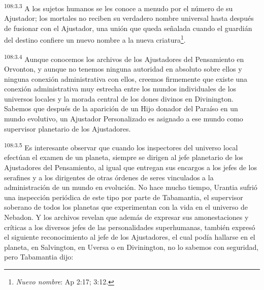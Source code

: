 \par
\textsuperscript{108:3.3} A los sujetos humanos se les conoce a menudo por el número de su Ajustador; los mortales no reciben su verdadero nombre universal hasta después de fusionar con el Ajustador, una unión que queda señalada cuando el guardián del destino confiere un nuevo nombre a la nueva criatura\footnote{\textit{Nuevo nombre}: Ap 2:17; 3:12.}.

\par
\textsuperscript{108:3.4} Aunque conocemos los archivos de los Ajustadores del Pensamiento en Orvonton, y aunque no tenemos ninguna autoridad en absoluto sobre ellos y ninguna conexión administrativa con ellos, creemos firmemente que existe una conexión administrativa muy estrecha entre los mundos individuales de los universos locales y la morada central de los dones divinos en Divinington. Sabemos que después de la aparición de un Hijo donador del Paraíso en un mundo evolutivo, un Ajustador Personalizado es asignado a ese mundo como supervisor planetario de los Ajustadores.

\par
\textsuperscript{108:3.5} Es interesante observar que cuando los inspectores del universo local efectúan el examen de un planeta, siempre se dirigen al jefe planetario de los Ajustadores del Pensamiento, al igual que entregan sus encargos a los jefes de los serafines y a los dirigentes de otras órdenes de seres vinculados a la administración de un mundo en evolución. No hace mucho tiempo, Urantia sufrió una inspección periódica de este tipo por parte de Tabamantia, el supervisor soberano de todos los planetas que experimentan con la vida en el universo de Nebadon. Y los archivos revelan que además de expresar sus amonestaciones y críticas a los diversos jefes de las personalidades superhumanas, también expresó el siguiente reconocimiento al jefe de los Ajustadores, el cual podía hallarse en el planeta, en Salvington, en Uversa o en Divinington, no lo sabemos con seguridad, pero Tabamantia dijo:

